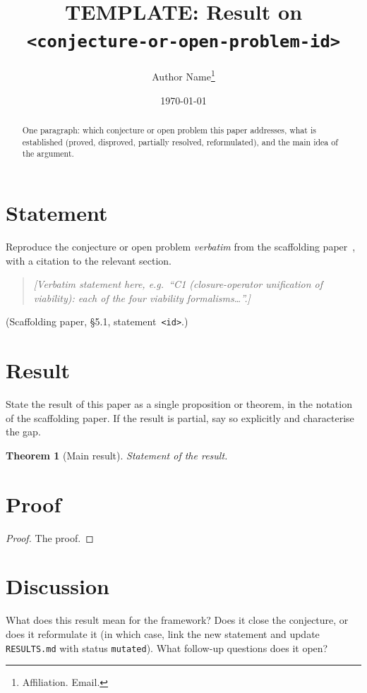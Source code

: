 \documentclass[11pt]{article}
\title{TEMPLATE: Result on \texttt{<conjecture-or-open-problem-id>}}
\author{Author Name\thanks{Affiliation. Email.}}
\date{\today}
\theoremstyle{plain}
\newtheorem{theorem}{Theorem}
\theoremstyle{definition}
\theoremstyle{remark}
\begin{document}
\maketitle

\begin{abstract}
One paragraph: which conjecture or open problem this paper addresses, what is
established (proved, disproved, partially resolved, reformulated), and the
main idea of the argument.
\end{abstract}

\section{Statement}

Reproduce the conjecture or open problem \emph{verbatim} from the scaffolding
paper~\cite{emergent_systems_2026}, with a citation to the relevant section.

\begin{quote}
\emph{[Verbatim statement here, e.g.\ ``C1 (closure-operator unification of
viability): each of the four viability formalisms\dots''.]}
\end{quote}

\noindent (Scaffolding paper, \S5.1, statement~\texttt{<id>}.)

\section{Result}

State the result of this paper as a single proposition or theorem, in the
notation of the scaffolding paper. If the result is partial, say so explicitly
and characterise the gap.

\begin{theorem}[Main result]
\textit{Statement of the result.}
\end{theorem}

\section{Proof}

\begin{proof}
The proof.
\end{proof}

\section{Discussion}

What does this result mean for the framework? Does it close the conjecture, or
does it reformulate it (in which case, link the new statement and update
\texttt{RESULTS.md} with status \texttt{mutated}). What follow-up questions
does it open?



\end{document}
